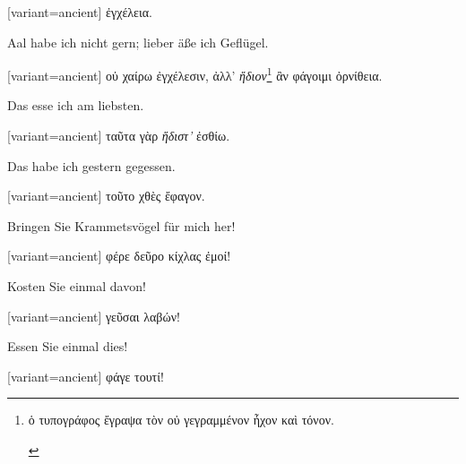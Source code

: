 \begin{greek}[variant=ancient]%
ἐγχέλεια.

\end{greek}%
\egroup\switchcolumn*

Aal habe ich nicht gern; lieber äße ich Geflügel.

\switchcolumn

\begin{greek}[variant=ancient]%
οὐ χαίρω ἐγχέλεσιν, ἀλλ' \emph{ἥδιον}\footnote{\begin{latin}%
\textgreek[variant=ancient]{ὁ τυπογράφος ἔγραψα τὸν οὐ γεγραμμένον
ἦχον καὶ τόνον.}\end{latin}%
} ἂν φάγοιμι ὀρνίθεια.

\end{greek}%
\switchcolumn*

Das esse ich am liebsten.

\switchcolumn

\begin{greek}[variant=ancient]%
ταῦτα γὰρ \emph{ἥδιστ'} ἐσθίω.

\end{greek}%
\switchcolumn*

Das habe ich gestern gegessen.

\switchcolumn

\begin{greek}[variant=ancient]%
τοῦτο χθὲς ἔφαγον.

\end{greek}%
\switchcolumn*

Bringen Sie Krammets\textcompwordmark{}vögel für mich her!

\switchcolumn

\begin{greek}[variant=ancient]%
φέρε δεῦρο κίχλας ἐμοί!

\end{greek}%
\switchcolumn*

Kosten Sie einmal davon!

\switchcolumn

\begin{greek}[variant=ancient]%
γεῦσαι λαβών!

\end{greek}%
\switchcolumn*

Essen Sie einmal dies!

\switchcolumn

\begin{greek}[variant=ancient]%
φάγε τουτί!

\end{greek}%
\switchcolumn*

